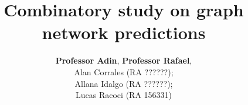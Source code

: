 \documentclass[11pt,a4paper]{article}
\begin{document}
\sloppy





\title{Combinatory study on graph network predictions}

\author{
    \normalsize
    \textbf{Professor Adin},
    \textbf{Professor Rafael},
    \normalsize
    \\
    \normalsize
    Alan Corrales (RA ??????); \\
    Allana Idalgo (RA ??????); \\
    Lucas  Racoci (RA 156331)
}
\date{\vspace{-5ex}}
\maketitle


\vspace*{0.5cm}

\begin{spacing}{1.15}

\setcounter{page}{1}


\setcounter{page}{1}



\end{spacing}

{\small
\begin{singlespace}


\end{singlespace}
}
\end{document}
